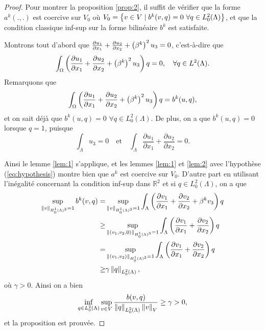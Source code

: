 \begin{proof}
  Pour montrer la proposition \ref{prop:2}, il suffit de vérifier
  que la forme $a^k(.,.)$ est coercive sur $V_0$ où $V_0 = \left\{ v
    \in V\mid b^k(v, q) = 0\ \forall q \in
    L^2_0(\Lambda) \right\}$, et que la condition classique inf-sup sur la forme
  bilinéaire $b^k$ est satisfaite.

  Montrons tout d'abord que $\frac{\partial u_1}{\partial x_1} +
  \frac{\partial u_2}{\partial x_2} + \left( \beta^k \right)^2 u_3 = 0$,
  c'est-à-dire que
  \begin{equation}
    \int_\Omega\left( \frac{\partial u_1}{\partial x_1} +
  \frac{\partial u_2}{\partial x_2} + \left( \beta^k \right)^2 u_3 \right)q =
    0,\quad \forall q\in L^2(\Lambda).
  \end{equation}
  Remarquons que
  \begin{equation}
    \int_\Omega\left( \frac{\partial u_1}{\partial x_1} +
      \frac{\partial u_2}{\partial x_2} + \left( \beta^k \right)^2 u_3 \right)q =
    b^k(u, q),
  \end{equation}
  et on sait déjà que $b^k(u, q) = 0$ $\forall q \in
  L_0^2(\Lambda)$. De plus, on a que $b^k(u, q) = 0$ lorsque $q = 1$,
  puisque
  \begin{equation}
    \int_\Lambda u_3  = 0 \quad \text{et}\quad \int_\Lambda
    \frac{\partial u_1}{\partial x_1} + \frac{\partial u_2}{\partial
      x_2} = 0.
  \end{equation}

  Ainsi le lemme \ref{lem:1} s'applique, et les lemmes \ref{lem:1} et
  \ref{lem:2} avec l'hypothèse (\ref{eq:hypothesis}) montre bien que
  $a^k$ est coercive sur $V_0$. D'autre part en utilisant l'inégalité
  concernant la condition inf-sup dans $\mathbb R^2$ et si $q\in
  L^2_0(\Lambda)$, on a que
  \begin{align*}
    \sup_{\left\lVert v \right\rVert_{H^1_0(\Lambda)^3} = 1} b^k(v,q) = &\sup_{\left\lVert v \right\rVert_{H^1_0(\Lambda)^3} = 1} \int_{\Lambda}\left( \frac{\partial v_1}{\partial x_1} + \frac{\partial v_2}{\partial x_2} + \beta^k v_3 \right)q\\
    \geq & \sup_{\left\lVert (v_1, v_2, 0) \right\rVert_{H^1_0(\Lambda)^3} =
      1}\int_{\Lambda}\left( \frac{\partial v_1}{\partial x_1} +
      \frac{\partial v_2}{\partial x_2} \right)q\\
    = & \sup_{\left\lVert (v_1, v_2) \right\rVert_{H^1_0(\Lambda)^2} = 1}\int_{\Lambda}\left( \frac{\partial v_1}{\partial x_1} + \frac{\partial v_2}{\partial x_2} \right)q\\
    \geq& \gamma \left\lVert q \right\rVert_{L^2_0(\Lambda)},
  \end{align*}
  où $\gamma > 0$. Ainsi on a bien
  \begin{equation*}
    \inf_{q\in L^2_0(\Lambda)}\sup_{v\in V} \frac{b(v,
      q)}{\left\lVert q \right\rVert_{L^2_0(\Lambda)}\left\lVert v \right\rVert_{V}} \geq \gamma > 0,
  \end{equation*}
  et la proposition est prouvée.
\end{proof}

